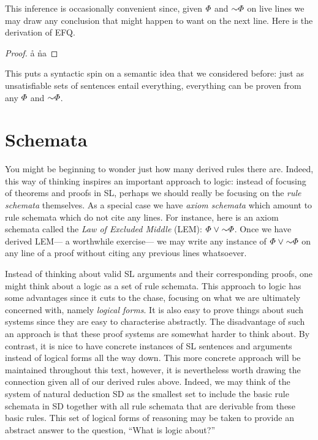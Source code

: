 This inference is occasionally convenient since, given $\varPhi$ and $\enot\metaA$ on live lines we may draw any conclusion that might happen to want on the next line. 
Here is the derivation of EFQ.

\begin{proof}
  \open 
     \as{}
     \r{a}
     \r{na}
  \close
   
\end{proof}

This puts a syntactic spin on a semantic idea that we considered before: just as unsatisfiable sets of sentences entail everything, everything can be proven from any $\varPhi$ and $\enot\metaA$. 


\section{Schemata}

You might be beginning to wonder just how many derived rules there are.
Indeed, this way of thinking inspires an important approach to logic: instead of focusing of theorems and proofs in SL, perhaps we should really be focusing on the \textit{rule schemata} themselves.
As a special case we have \textit{axiom schemata} which amount to rule schemata which do not cite any lines.
For instance, here is an axiom schemata called the \textit{Law of Excluded Middle} (LEM): $\metaA\eor\enot\metaA$.
Once we have derived LEM--- a worthwhile exercise--- we may write any instance of $\metaA\eor\enot\metaA$ on any line of a proof without citing any previous lines whatsoever.

Instead of thinking about valid SL arguments and their corresponding proofs, one might think about a logic as a set of rule schemata.
This approach to logic has some advantages since it cuts to the chase, focusing on what we are ultimately concerned with, namely \textit{logical forms}.
It is also easy to prove things about such systems since they are easy to characterise abstractly.
The disadvantage of such an approach is that these proof systems are somewhat harder to think about.
By contrast, it is nice to have concrete instances of SL sentences and arguments instead of logical forms all the way down.
This more concrete approach will be maintained throughout this text, however, it is nevertheless worth drawing the connection given all of our derived rules above.
Indeed, we may think of the system of natural deduction SD as the smallest set to include the basic rule schemata in SD together with all rule schemata that are derivable from these basic rules.
This set of logical forms of reasoning may be taken to provide an abstract answer to the question, ``What is logic about?''


